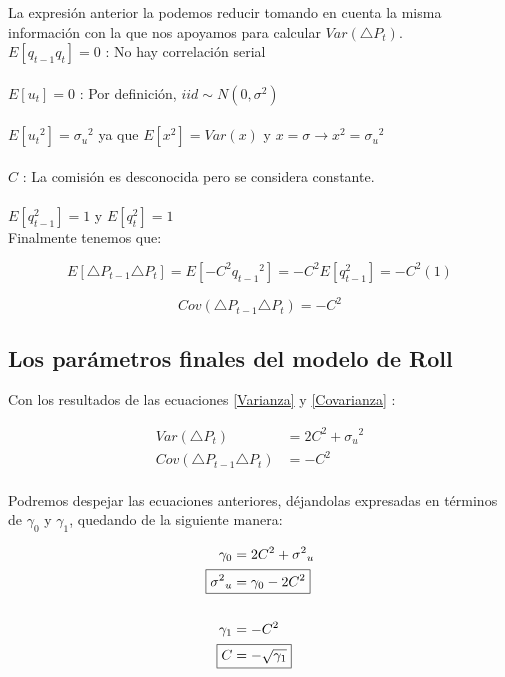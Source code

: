 \documentclass[a4paper]{article}
\begin{document}
La expresi\'on anterior la podemos reducir tomando en cuenta la misma informaci\'on con la que nos apoyamos para calcular $Var(\triangle{P}_{t})$. \\

$E \left[ {q}_{t-1}{q}_{t} \right] = 0$ : No hay correlaci\'on serial \\\\
$E \left[ {u}_{t} \right] = 0$ : Por definici\'on, $iid \sim N(0,{\sigma}^{2})$ \\\\
$E \left[ {{u}_{t}}^{2} \right] = {{\sigma}_{u}}^{2}$ ya que $E \left[ {x}^{2} \right] = Var(x)$ y $x=\sigma \rightarrow {x}^{2} =  {{\sigma}_{u}}^{2}$ \\\\
$C$ : La comisi\'on es desconocida pero se considera constante. \\\\
$E\left[ {{q}}^{2}_{t-1} \right] = 1$ y $E\left[ {{q}}^{2}_{t} \right] = 1$ 
\\

Finalmente tenemos que:

\begin{equation*}
E \left[ \triangle{P}_{t-1}\triangle{P}_{t} \right] = E\left[ -{C}^{2}{{q}_{t-1}}^{2} \right] = 
	-{C}^{2} E\left[ {{q}}^{2}_{t-1} \right] = -{C}^{2} (1)
\end{equation*}

\begin{equation}\label{Covarianza}
 \boxed{ Cov(\triangle{P}_{t-1}\triangle{P}_{t}) = -{C}^{2} }
\end{equation}

\subsection*{Los par\'ametros finales del modelo de \textbf{Roll}} 

Con los resultados de las ecuaciones \eqref{Varianza} y \eqref{Covarianza} : 

\begin{equation}
\begin{aligned}
	Var(\triangle{P}_{t}) &= 2{C}^{2} + {{\sigma}_{u}}^{2} \\
	Cov(\triangle{P}_{t-1}\triangle{P}_{t}) &= -{C}^{2}
\end{aligned}
\end{equation}
\\

Podremos despejar las ecuaciones anteriores, d\'ejandolas expresadas en t\'erminos de ${\gamma}_{0}$ y 
${\gamma}_{1}$, quedando de la siguiente manera:

\begin{equation}
\begin{aligned}
	{\gamma}_{0} &= 2{C}^{2} + {{\sigma}^{2}}_{u} \\
    \Aboxed{ {{\sigma}^{2}}_{u} &= {\gamma}_{0} - 2{C}^{2} } \\\\
    {\gamma}_{1} &= -{C}^{2} \\
    \Aboxed{ C &= -\sqrt { { \gamma  }_{ 1 } } }
\end{aligned}
\end{equation}
\end{document}

